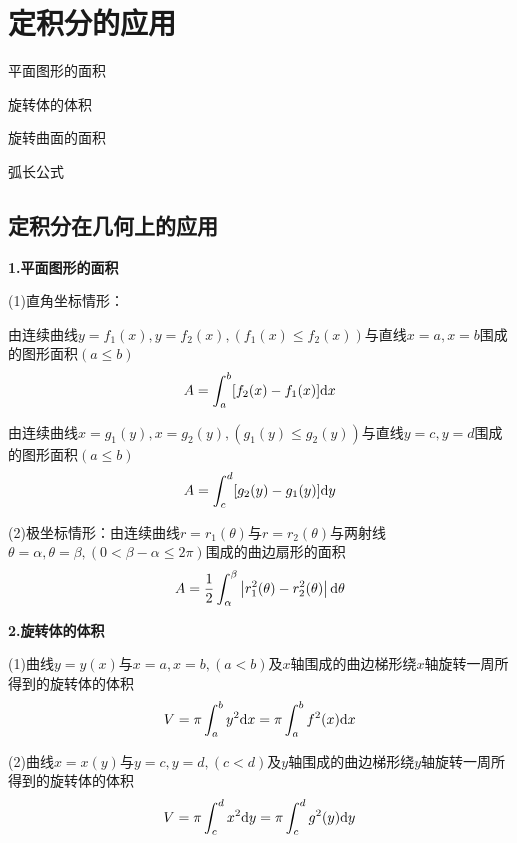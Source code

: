 \setcounter{chapter}{5}

\chapter{定积分的应用}

\begin{introduction}
    \item 平面图形的面积
    \item 旋转体的体积
    \item 旋转曲面的面积
    \item 弧长公式
\end{introduction}

\section{定积分在几何上的应用}
\textbf{1.平面图形的面积}

(1)直角坐标情形：

由连续曲线$y=f_1(x),y=f_2(x),(f_1(x)\leq f_2(x))$与直线$x=a,x=b$围成的图形面积$(a\leq b)$
\begin{equation}
    A=\int_a^b [f_2(x)-f_1(x)]\mathrm{d} x
    \nonumber
\end{equation}

由连续曲线$x=g_1(y),x=g_2(y),(g_1(y)\leq g_2(y))$与直线$y=c,y=d$围成的图形面积$(a\leq b)$
\begin{equation}
    A=\int_c^d [g_2(y)-g_1(y)]\mathrm{d} y
    \nonumber
\end{equation}

(2)极坐标情形：由连续曲线$r=r_1(\theta)$与$r=r_2(\theta)$与两射线$\theta=\alpha,\theta=\beta,(0<\beta-\alpha\leq 2\pi)$围成的曲边扇形的面积
\begin{equation}
    A=\dfrac{1}{2}\int_\alpha^\beta \left|r_1^2(\theta)-r_2^2(\theta)\right|\mathrm{d} \theta
    \nonumber
\end{equation}

\textbf{2.旋转体的体积}

(1)曲线$y=y(x)$与$x=a,x=b,(a<b)$及$x$轴围成的曲边梯形绕$x$轴旋转一周所得到的旋转体的体积
\begin{equation}
    V=\pi\int_a^b y^2\mathrm{d} x=\pi \int_a^b f^2(x)\mathrm{d} x
    \nonumber
\end{equation}

(2)曲线$x=x(y)$与$y=c,y=d,(c<d)$及$y$轴围成的曲边梯形绕$y$轴旋转一周所得到的旋转体的体积
\begin{equation}
    V=\pi\int_c^d x^2\mathrm{d} y=\pi \int_c^d g^2(y)\mathrm{d} y
    \nonumber
\end{equation}

